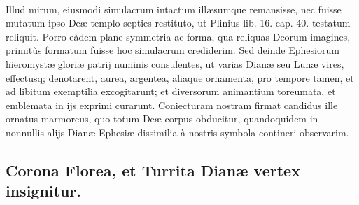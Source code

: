 \documentclass[a4paper, 11pt, oneside, polutonikogreek, latin]{article}
\begin{document}
\paragraph{}
Illud mirum, eiusmodi simulacrum intactum illæsumque remansisse, nec fuisse mutatum ipso Deæ templo septies restituto, ut Plinius lib. 16. cap. 40. testatum reliquit. Porro eàdem plane symmetria ac forma, qua reliquas Deorum imagines, primitùs formatum fuisse hoc simulacrum crediderim. Sed deinde Ephesiorum hieromystæ gloriæ patrij numinis consulentes, ut varias Dianæ seu Lunæ vires, effectusq; denotarent, aurea, argentea, aliaque ornamenta, pro tempore tamen, et ad libitum exemptilia excogitarunt; et diversorum animantium toreumata, et emblemata in ijs exprimi curarunt. Coniecturam nostram firmat candidus ille ornatus marmoreus, quo totum Deæ corpus obducitur, quandoquidem in nonnullis alijs Dianæ Ephesiæ dissimilia à nostris symbola contineri observarim.
\clearpage
\subsection{Corona Florea, et Turrita Dianæ vertex insignitur.}
\end{document}
